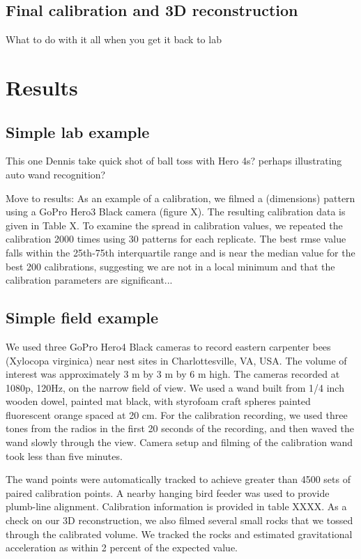 \documentclass[fleqn,10pt]{wlpeerj}
\begin{document}
\subsection*{Final calibration and 3D reconstruction}
What to do with it all when you get it back to lab





\section*{Results}
\subsection*{Simple lab example}
This one Dennis take quick shot of ball toss with Hero 4s? perhaps illustrating auto wand recognition?

Move to results: As an example of a calibration, we filmed a (dimensions) pattern using a GoPro Hero3 Black camera (figure X).  The resulting calibration data is given in Table X. To examine the spread in calibration values, we repeated the calibration 2000 times using 30 patterns for each replicate. The best rmse value falls within the 25th-75th interquartile range and is near the median value for the best 200 calibrations, suggesting we are not in a local minimum and that the calibration parameters are significant...   

\subsection*{Simple field example}
We used three GoPro Hero4 Black cameras to record eastern carpenter bees (Xylocopa virginica) near nest sites in Charlottesville, VA, USA.  
The volume of interest was approximately 3 m by 3 m by 6 m high.  The cameras recorded at 1080p, 120Hz, on the narrow field of view.   We used a wand built from 1/4 inch wooden dowel, painted mat black, with styrofoam craft spheres painted fluorescent orange spaced at 20 cm.  For the calibration recording, we used three tones from the radios in the first 20 seconds of the recording, and then waved the wand slowly through the view.  Camera setup and filming of the calibration wand took less than five minutes.

The wand points were automatically tracked to achieve greater than 4500 sets of paired calibration points.  A nearby hanging bird feeder was used to provide plumb-line alignment.  Calibration information is provided in table XXXX.  As a check on our 3D reconstruction, we also filmed several small rocks that we tossed through the calibrated volume.  We tracked the rocks and estimated gravitational acceleration as within 2 percent of the expected value.  
\end{document}
